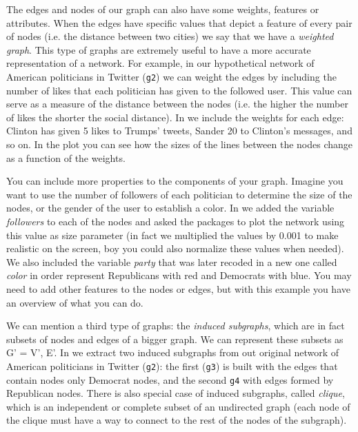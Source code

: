 
The edges and nodes of our graph can also have some weights, features or attributes. When the edges have specific values that depict a feature of every pair of nodes (i.e. the distance between two cities) we say that we have a \textit{weighted graph}. This type of graphs are extremely useful to have a more accurate representation of a network. For example, in our hypothetical network of American politicians in Twitter (\texttt{g2}) we can weight the edges by including the number of likes that each politician has given to the followed user. This value  can serve as a measure of the distance between the nodes (i.e. the higher the number of likes the shorter the social distance). In  we include the weights for each edge: Clinton has given 5 likes to Trumps' tweets, Sander 20 to Clinton's messages, and so on. In the plot you can see how the sizes of the lines between the nodes change as a function of the weights.


You can include more properties to the components of your graph. Imagine you want to use the number of followers of each politician to determine the size of the nodes, or the gender of the user to establish a color. In  we added the variable \emph{followers} to each of the nodes and asked the packages to plot the network using this value as size parameter (in fact we multiplied the values by 0.001 to make realistic on the screen, boy you could also normalize these values when needed). We also included the variable \emph{party} that was later recoded in a new one called \emph{color} in order represent Republicans with red and Democrats with blue.  You may need to add other features to the nodes or edges, but with this example you have an overview of what you can do.


We can  mention a third type of graphs: the \textit{induced subgraphs}, which are in fact subsets of nodes and edges of a bigger graph. We can represent these subsets as G' = V', E'. In  we extract two induced subgraphs from out original network of American politicians in Twitter (\texttt{g2}): the first (\texttt{g3}) is built with the edges that contain nodes only Democrat nodes, and the second \texttt{g4} with edges formed by Republican nodes. There is also special case of induced subgraphs, called \textit{clique}, which is an independent or complete subset of an undirected graph (each node of the clique must have a way to connect to the rest of the nodes of the subgraph).

